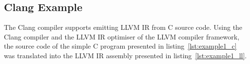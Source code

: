 
\subsection{Clang Example}
\label{app:clang_example}

The Clang compiler supports emitting LLVM IR from C source code. Using the Clang compiler and the LLVM IR optimiser of the LLVM compiler framework, the source code of the simple C program presented in listing~\ref{lst:example1_c} was translated into the LLVM IR assembly presented in listing~\ref{lst:example1_ll}.




